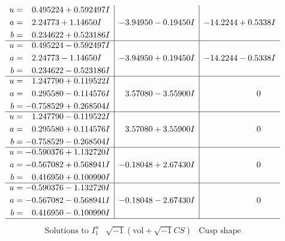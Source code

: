 \documentclass[1p]{elsarticle_modified}
\theoremstyle{definition}
\newcommand{\I}{\sqrt{-1}}
\begin{document}
$$\begin{array}{c|c|c}
\begin{aligned}
u &= \phantom{-}0.495224 + 0.592497 I \\
a &= \phantom{-}2.24773 + 1.14650 I \\
b &= \phantom{-}0.234622 + 0.523186 I\end{aligned}
 & -3.94950 - 0.19450 I & -14.2244 + 0.5338 I \\ \hline\begin{aligned}
u &= \phantom{-}0.495224 - 0.592497 I \\
a &= \phantom{-}2.24773 - 1.14650 I \\
b &= \phantom{-}0.234622 - 0.523186 I\end{aligned}
 & -3.94950 + 0.19450 I & -14.2244 - 0.5338 I \\ \hline\begin{aligned}
u &= \phantom{-}1.247790 + 0.119522 I \\
a &= \phantom{-}0.295580 - 0.114576 I \\
b &= -0.758529 + 0.268504 I\end{aligned}
 & \phantom{-}3.57080 - 3.55900 I & \phantom{-0.000000 } 0 \\ \hline\begin{aligned}
u &= \phantom{-}1.247790 - 0.119522 I \\
a &= \phantom{-}0.295580 + 0.114576 I \\
b &= -0.758529 - 0.268504 I\end{aligned}
 & \phantom{-}3.57080 + 3.55900 I & \phantom{-0.000000 } 0 \\ \hline\begin{aligned}
u &= -0.590376 + 1.132720 I \\
a &= -0.567082 + 0.568941 I \\
b &= \phantom{-}0.416950 + 0.100990 I\end{aligned}
 & -0.18048 + 2.67430 I & \phantom{-0.000000 } 0 \\ \hline\begin{aligned}
u &= -0.590376 - 1.132720 I \\
a &= -0.567082 - 0.568941 I \\
b &= \phantom{-}0.416950 - 0.100990 I\end{aligned}
 & -0.18048 - 2.67430 I & \phantom{-0.000000 } 0\\
 \hline 
 \end{array}$$\newpage$$\begin{array}{c|c|c}  
\text{Solutions to }I^u_{1}& \I (\text{vol} + \sqrt{-1}CS) & \text{Cusp shape}\\
 \hline 
\begin{aligned}

\end{aligned}
\end{array}$$
\end{document}
